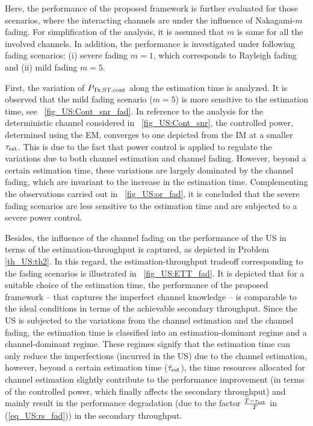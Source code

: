 Here, the performance of the proposed framework is further evaluated for those scenarios, where the interacting channels are under the influence of Nakagami-$m$ fading. For simplification of the analysis, it is assumed that $m$ is same for all the involved channels. In addition, the performance is investigated under following fading scenarios: (i) severe fading $m=1$, which corresponds to Rayleigh fading
and (ii) mild fading $m = 5$. 

First, the variation of $P_{\text{Tx,ST,cont}}$ along the estimation time is analyzed. It is observed that the mild fading scenario ($m = 5$) is more sensitive to the estimation time, see \figurename~\ref{fig_US:Cont_snr_fad}. In reference to the analysis for the deterministic channel considered in \figurename~\ref{fig_US:Cont_snr}, the controlled power, determined using the EM, converges to one depicted from the IM at a smaller $\tau_{\text{est}}$. This is due to the fact that power control is applied to regulate the variations due to both channel estimation and channel fading. However, beyond a certain estimation time, these variations are largely dominated by the channel fading, which are invariant to the increase in the estimation time. Complementing the observations carried out in \figurename~\ref{fig_US:or_fad}, it is concluded that the severe fading scenarios are less sensitive to the estimation time and are subjected to a severe power control.
 

Besides, the influence of the channel fading on the performance of the US in terms of the estimation-throughput is captured, as depicted in Problem \ref{th_US:th2}. In this regard, the estimation-throughput tradeoff corresponding to the fading scenarios is illustrated in \figurename~\ref{fig_US:ETT_fad}. It is depicted that for a suitable choice of the estimation time, the performance of the proposed framework -- that captures the imperfect channel knowledge -- is comparable to the ideal conditions in terms of the achievable secondary throughput. Since the US is subjected to the variations from the channel estimation and the channel fading, the estimation time is classified into an estimation-dominant regime and a channel-dominant regime. These regimes signify that the estimation time can only reduce the imperfections (incurred in the US) due to the channel estimation, however, beyond a certain estimation time ($\tilde{\tau}_{\text{est}}$), the time resources allocated for channel estimation slightly contribute to the performance improvement (in terms of the controlled power, which finally affects the secondary throughput) and mainly result in the performance degradation (due to the factor $\frac{T - \tau_{\text{est}}}{T}$ in (\ref{eq_US:rs_fad})) in the secondary throughput. 


